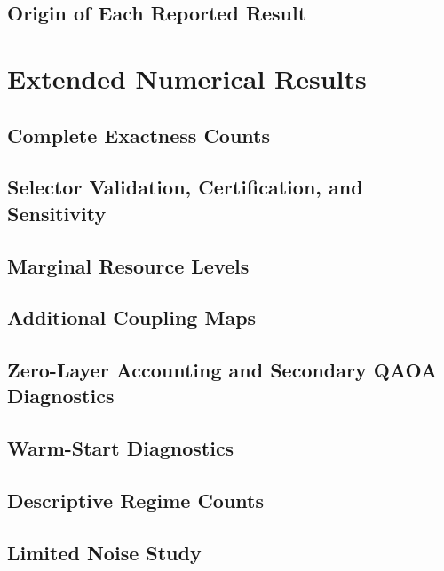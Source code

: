 \documentclass[journal,onecolumn,11pt]{IEEEtran}
\theoremstyle{plain}
\begin{document}
\subsection{Origin of Each Reported Result}
\label{sup:provenance:origin}


\section{Extended Numerical Results}
\label{sup:results}

\subsection{Complete Exactness Counts}
\label{sup:results:exactness}

\subsection{Selector Validation, Certification, and Sensitivity}
\label{sup:results:selector}

\subsection{Marginal Resource Levels}
\label{sup:results:marginal}

\subsection{Additional Coupling Maps}
\label{sup:results:topologies}

\subsection{Zero-Layer Accounting and Secondary QAOA Diagnostics}
\label{sup:results:qaoa}

\subsection{Warm-Start Diagnostics}
\label{sup:results:warmstart}

\subsection{Descriptive Regime Counts}
\label{sup:results:regime}

\subsection{Limited Noise Study}
\label{sup:results:noise}


\end{document}
